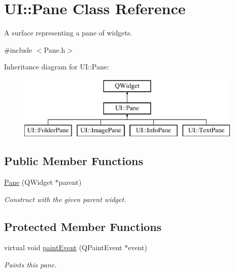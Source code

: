 \hypertarget{class_u_i_1_1_pane}{\section{U\-I\-:\-:Pane Class Reference}
\label{class_u_i_1_1_pane}
}


A surface representing a pane of widgets.  




{\ttfamily \#include $<$Pane.\-h$>$}

Inheritance diagram for U\-I\-:\-:Pane\-:\begin{figure}[H]
\begin{center}
\leavevmode
\includegraphics[height=3.000000cm]{class_u_i_1_1_pane}
\end{center}
\end{figure}
\subsection*{Public Member Functions}
\begin{DoxyCompactItemize}
\item 
\hyperlink{class_u_i_1_1_pane_a1df7b2bd21972af848facbbd2ca77771}{Pane} (Q\-Widget $\ast$parent)
\begin{DoxyCompactList}\small\item\em Construct with the given parent widget. \end{DoxyCompactList}\end{DoxyCompactItemize}
\subsection*{Protected Member Functions}
\begin{DoxyCompactItemize}
\item 
virtual void \hyperlink{class_u_i_1_1_pane_ac9969b1a3c4f3783d1659e85670c995b}{paint\-Event} (Q\-Paint\-Event $\ast$event)
\begin{DoxyCompactList}\small\item\em Paints this pane. \end{DoxyCompactList}\end{DoxyCompactItemize}



